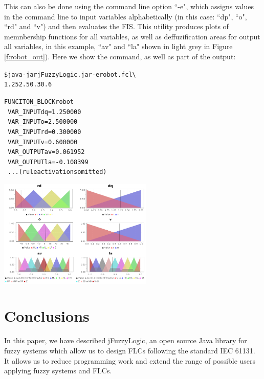 \documentclass[11pt,twoside]{article}
\begin{document}
\begin{multicols}{2}
This can also be done using the command line option ``-e", which assigns values in the command line to input variables alphabetically (in this case: ``dp", ``o", ``rd" and ``v") and then evaluates the FIS. 
This utility produces plots of memnbership functions for all variables, as well as deffuzification areas for output all variables, in this example, ``av" and ``la" shown in light grey in Figure \ref{f:robot_out}).
Here we show the command, as well as part of the output:
\\
\begin{scriptsize}
\begin{alltt}
\$ java -jar jFuzzyLogic.jar -e robot.fcl \textbackslash
      1.25 2.5 0.3 0.6

FUNCITON_BLOCK robot
\ 	VAR_INPUT 	        dq = 1.250000
\ 	VAR_INPUT 	         o = 2.500000
\ 	VAR_INPUT 	        rd = 0.300000
\ 	VAR_INPUT 	         v = 0.600000
\ 	VAR_OUTPUT	        av = 0.061952
\ 	VAR_OUTPUT	        la = -0.108399
\   ...(rule activations omitted)
\end{alltt}
\end{scriptsize}

\vspace*{10pt}
\centerline{\includegraphics[width=2.9in]{./figs/robot_out2.png}}
\vspace*{10pt}
\label{f:robot_out}
\vspace*{10pt}


\section{Conclusions \label{sec:con}}

In this paper, we have described jFuzzyLogic, an open source Java library for fuzzy systems which allow us to design FLCs following the standard IEC 61131.
It allows us to reduce programming work and extend the range of possible users applying fuzzy systems and FLCs.


\end{multicols}
\end{document}

